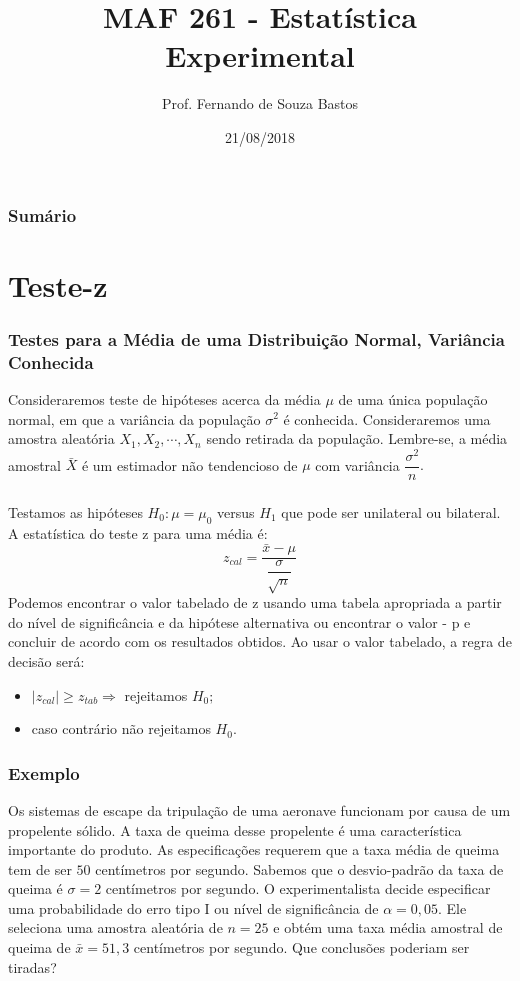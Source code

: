 \documentclass[14pt,aspectratio=1610]{beamer}
\title{MAF 261 - Estatística Experimental}
\author{Prof. Fernando de Souza Bastos}
\institute{Instituto de Ciências Exatas e Tecnológicas\texorpdfstring{\\ Universidade Federal de Viçosa}{}\texorpdfstring{\\ Campus UFV - Florestal}{}}
\date{21/08/2018}
\newcommand{\bx}{\ensuremath{\bar{x}}}
\newcommand{\Ho}{\ensuremath{H_{0}}}
\newcommand{\Hi}{\ensuremath{H_{1}}}
\begin{document}


\frame{\titlepage}

\begin{frame}{}
\frametitle{\bf Sumário}
\tableofcontents
\end{frame}

\section{Teste-z}
\begin{frame}{}
\frametitle{Testes para a Média de uma Distribuição Normal, Variância Conhecida}
\begin{block}{}
\justifying
Consideraremos teste de hipóteses acerca da média $\mu$ de uma única população normal, em que a variância da população $\sigma^{2}$ é conhecida. Consideraremos uma amostra aleatória $X_{1}, X_{2},\cdots, X_{n}$ sendo retirada da população. Lembre-se, a média amostral $\bar{X}$ é um estimador não tendencioso de $\mu$ com 
variância $\dfrac{\sigma^{2}}{n}.$
\end{block}
\end{frame}

\begin{frame}{}
\frametitle{}
\begin{block}{}
\justifying
Testamos as hipóteses $\Ho:\mu=\mu_{0}$ versus $\Hi$ que pode ser unilateral ou bilateral. A estatística do teste z para uma média é:
$$z_{cal}=\dfrac{\bx-\mu}{\dfrac{\sigma}{\sqrt{n}}}$$
Podemos encontrar o valor tabelado de z usando uma tabela apropriada a partir do nível de significância e da hipótese alternativa ou 
encontrar o valor - p e concluir de acordo com os resultados obtidos. Ao usar o valor tabelado, a regra de decisão será:
\begin{itemize}
\item $|z_{cal}|\geq z_{tab}\Rightarrow$ rejeitamos $\Ho;$
\item caso contrário não rejeitamos $\Ho.$
\end{itemize}
\end{block}
\end{frame}

\begin{frame}{}
\frametitle{Exemplo}
\begin{block}{}
\justifying
Os sistemas de escape da tripulação de uma aeronave funcionam por causa de um propelente sólido. A taxa de queima desse propelente é uma característica importante 
do produto. As especificações requerem que a taxa média de queima tem de ser $50$ centímetros por segundo. Sabemos que o desvio-padrão da taxa de queima é 
$\sigma = 2$ centímetros por segundo. O experimentalista decide especificar uma probabilidade do erro tipo I ou nível de significância de $\alpha = 0,05.$ Ele seleciona 
uma amostra aleatória de $n = 25$ e obtém uma taxa média amostral de queima de $\bx = 51,3$ centímetros por segundo. Que conclusões poderiam ser tiradas?
\end{block}
\end{frame}
\end{document}
